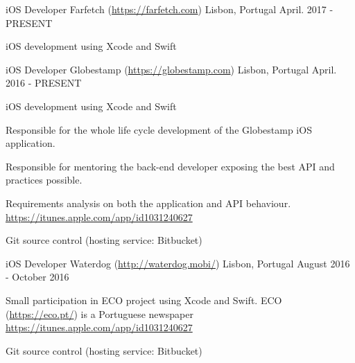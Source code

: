 

\begin{cventries}

\cventry
{iOS Developer} %
{Farfetch (\url{https://farfetch.com}) } %
{Lisbon, Portugal} %
{April. 2017 - PRESENT} %
{
	\begin{cvitems} %
		\item{iOS development using Xcode and Swift}
	\end{cvitems}
}

  \cventry
    {iOS Developer} %
    {Globestamp (\url{https://globestamp.com}) } %
    {Lisbon, Portugal} %
    {April. 2016 - PRESENT} %
    {
      \begin{cvitems} %
      	\item{iOS development using Xcode and Swift}
        \item {Responsible for the whole life cycle development of the Globestamp iOS application.}
        \item {Responsible for mentoring the back-end developer exposing the best API and practices possible.}
        \item {Requirements analysis on both the application and API behaviour.\\}
		\url{https://itunes.apple.com/app/id1031240627}
	 	\item {Git source control (hosting service: Bitbucket)}
      \end{cvitems}
    }

  \cventry
	{iOS Developer} %
    {Waterdog (\url{http://waterdog.mobi/}) } %
    {Lisbon, Portugal} %
    {August 2016 - October 2016} %
    {
	\begin{cvitems} %
		\item {Small participation in ECO project using Xcode and Swift. ECO (\url{https://eco.pt/}) is a Portuguese newspaper\\}
		\url{https://itunes.apple.com/app/id1031240627}
		\item {Git source control (hosting service: Bitbucket)}
	\end{cvitems}
}


\end{cventries}

